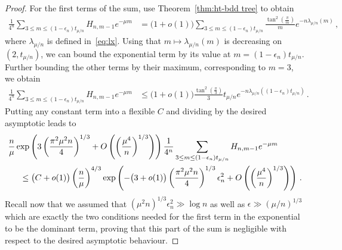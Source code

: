 \documentclass{article}
\newcommand{\1}{\mathbbm{1}}								%
\theoremstyle{definition}
\numberwithin{equation}{section}
\begin{document}
\begin{proof}
    For the first terms of the sum, use Theorem~\ref{thm:ht-bdd tree} to obtain
    \begin{align*}
        \frac{1}{4^n}\sum_{3\leq m\leq(1-\epsilon_n)t_{\mu/n}}H_{n,m-1}e^{-\mu m}&=\big(1+o(1)\big)\sum_{3\leq m\leq(1-\epsilon_n)t_{\mu/n}}\frac{\tan^2\left(\frac{\pi}{m}\right)}{m}e^{-n\lambda_{\mu/n}(m)}\,,
    \end{align*}
    where $\lambda_{\mu/n}$ is defined in~\eqref{eq:lx}.
    Using that $m\mapsto\lambda_{\mu/n}(m)$ is decreasing on $(2,t_{\mu/n})$, we can bound the exponential term by its value at $m=(1-\epsilon_n)t_{\mu/n}$.
    Further bounding the other terms by their maximum, corresponding to $m=3$, we obtain
    \begin{align*}
        \frac{1}{4^n}\sum_{3\leq m\leq(1-\epsilon_n)t_{\mu/n}}H_{n,m-1}e^{-\mu m}&\leq\big(1+o(1)\big)\frac{\tan^2\left(\frac{\pi}{3}\right)}{3}t_{\mu/n}e^{-n\lambda_{\mu/n}((1-\epsilon_n)t_{\mu/n})}\,.
    \end{align*}
    Putting any constant term into a flexible $C$ and dividing by the desired asymptotic leads to
    \begin{align*}
        &\frac{n}{\mu}\exp\left(3\left(\frac{\pi^2\mu^2n}{4}\right)^{1/3}+O\left(\left(\frac{\mu^4}{n}\right)^{1/3}\right)\right)\frac{1}{4^n}\sum_{3\leq m\leq(1-\epsilon_n)t_{\mu/n}}H_{n,m-1}e^{-\mu m}\\
        &\hspace{0.5cm}\leq\big(C+o(1)\big)\left(\frac{n}{\mu}\right)^{4/3}\exp\left(-\big(3+o(1)\big)\left(\frac{\pi^2\mu^2n}{4}\right)^{1/3}\epsilon_n^2+O\left(\left(\frac{\mu^4}{n}\right)^{1/3}\right)\right)\,.
    \end{align*}
    Recall now that we assumed that $(\mu^2n)^{1/3}\epsilon_n^2\gg\log n$ 
    as well as $\epsilon\gg(\mu/n)^{1/3}$ which are exactly the two conditions needed for the first term in the exponential to be the dominant term, proving that this part of the sum is negligible with respect to the desired asymptotic behaviour.
    

\end{proof}
\end{document}
